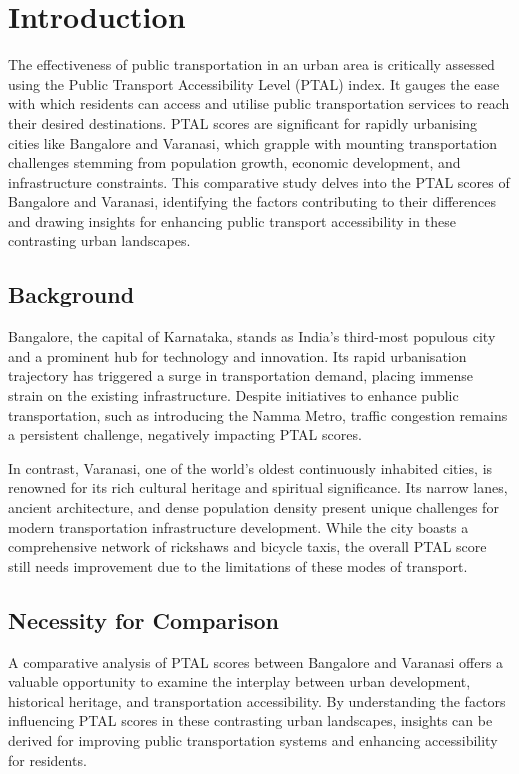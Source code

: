 \documentclass[11pt]{article}
\begin{document}
\section{Introduction}

The effectiveness of public transportation in an urban area is critically assessed using the
Public Transport Accessibility Level (PTAL) index. It gauges the ease with which residents can
access and utilise public transportation services to reach their desired destinations. PTAL
scores are significant for rapidly urbanising cities like Bangalore and Varanasi, which grapple
with mounting transportation challenges stemming from population growth, economic development,
and infrastructure constraints. This comparative study delves into the PTAL scores of Bangalore
and Varanasi, identifying the factors contributing to their differences and drawing insights for
enhancing public transport accessibility in these contrasting urban landscapes.

\subsection{Background}

Bangalore, the capital of Karnataka, stands as India's third-most populous city and a prominent
hub for technology and innovation. Its rapid urbanisation trajectory has triggered a surge in
transportation demand, placing immense strain on the existing infrastructure. Despite
initiatives to enhance public transportation, such as introducing the Namma Metro, traffic
congestion remains a persistent challenge, negatively impacting PTAL scores.

In contrast, Varanasi, one of the world's oldest continuously inhabited cities, is renowned for
its rich cultural heritage and spiritual significance. Its narrow lanes, ancient architecture,
and dense population density present unique challenges for modern transportation infrastructure
development. While the city boasts a comprehensive network of rickshaws and bicycle taxis, the
overall PTAL score still needs improvement due to the limitations of these modes of transport.

\subsection{Necessity for Comparison}

A comparative analysis of PTAL scores between Bangalore and Varanasi offers a valuable
opportunity to examine the interplay between urban development, historical heritage, and
transportation accessibility. By understanding the factors influencing PTAL scores in these
contrasting urban landscapes, insights can be derived for improving public transportation
systems and enhancing accessibility for residents.
\end{document}
